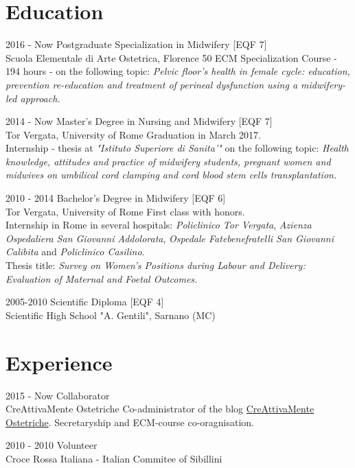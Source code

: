 \documentclass[]{friggeri-cv}
\begin{document}
\section{Education}
\begin{entrylist}
	\entry
	{2016 - Now}
	{Postgraduate Specialization in Midwifery [\small EQF 7]}
	{\\Scuola Elementale di Arte Ostetrica, Florence}
	{50 ECM Specialization Course - 194 hours - on the following topic: \emph{Pelvic floor's health in female cycle: education, prevention re-education and treatment of perineal dysfunction using a midwifery-led approach.}\\}
	
	\entry
	{2014 - Now}
	{Master's Degree in Nursing and Midwifery [\small EQF 7]}
	{\\Tor Vergata, University of Rome}
	{Graduation in March 2017. \\Internship - thesis at \textit{"Istituto Superiore di Sanita'"} on the following topic: \textit{Health knowledge, attitudes and practice of midwifery students, pregnant women and midwives on umbilical cord clamping and cord blood stem cells transplantation.}\\}
	
	\entry
	{2010 - 2014}
	{Bachelor's Degree in Midwifery [\small EQF 6]}
	{\\Tor Vergata, University of Rome}
	{First class with honors.\\
	Internship in Rome in several hospitals: \textit{Policlinico Tor Vergata}, \textit{Azienza Ospedaliera San Giovanni Addolorata}, \textit{Ospedale Fatebenefratelli San Giovanni Calibita} and \textit{Policlinico Casilino}.\\
	Thesis title: \textit{Survey on Women's Positions during Labour and Delivery: Evaluation of Maternal and Foetal Outcomes.}\\}

	\entry
	{2005-2010}
	{Scientific Diploma [\small EQF 4]}
	{\\Scientific High School "A. Gentili", Sarnano (MC)}
	{}
\end{entrylist}

\section{Experience}
\begin{entrylist}
  \entry
  {2015 - Now}
  {Collaborator}
  {\\CreAttivaMente Ostetriche}
  {Co-administrator of the blog \href{http://creattivamenteostetriche2012.blogspot.it/}{CreAttivaMente Ostetriche}. 
  	Secretaryship and ECM-course co-oragnisation.\\}
  
  \entry
    {2010 - 2010}
    {Volunteer}
    {\\Croce Rossa Italiana - Italian Commitee of Sibillini}
    {\\}
\end{entrylist}
\end{document}
